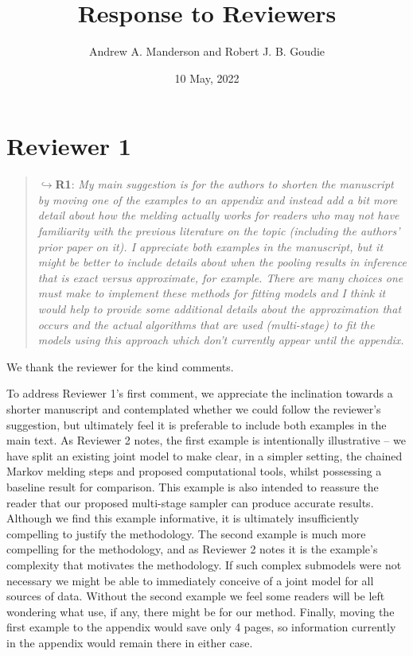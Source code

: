 \documentclass[
  10pt,
  a4paper,
]{article}
\title{Response to Reviewers}
\author{Andrew A. Manderson and Robert J. B. Goudie}
\date{10 May, 2022}
\begin{document}
\maketitle

\hypertarget{reviewer-1}{%
\section*{Reviewer 1}\label{reviewer-1}}

\begin{quote}
\(\hookrightarrow\)\textbf{R1}: \emph{My main suggestion is for the
authors to shorten the manuscript by moving one of the examples to an
appendix and instead add a bit more detail about how the melding
actually works for readers who may not have familiarity with the
previous literature on the topic (including the authors' prior paper on
it). I appreciate both examples in the manuscript, but it might be
better to include details about when the pooling results in inference
that is exact versus approximate, for example. There are many choices
one must make to implement these methods for fitting models and I think
it would help to provide some additional details about the approximation
that occurs and the actual algorithms that are used (multi-stage) to fit
the models using this approach which don't currently appear until the
appendix.}
\end{quote}

We thank the reviewer for the kind comments.

To address Reviewer 1's first comment, we appreciate the inclination
towards a shorter manuscript and contemplated whether we could follow
the reviewer's suggestion, but ultimately feel it is preferable to
include both examples in the main text. As Reviewer 2 notes, the first
example is intentionally illustrative -- we have split an existing joint
model to make clear, in a simpler setting, the chained Markov melding
steps and proposed computational tools, whilst possessing a baseline
result for comparison. This example is also intended to reassure the
reader that our proposed multi-stage sampler can produce accurate
results. Although we find this example informative, it is ultimately
insufficiently compelling to justify the methodology. The second example
is much more compelling for the methodology, and as Reviewer 2 notes it
is the example's complexity that motivates the methodology. If such
complex submodels were not necessary we might be able to immediately
conceive of a joint model for all sources of data. Without the second
example we feel some readers will be left wondering what use, if any,
there might be for our method. Finally, moving the first example to the
appendix would save only 4 pages, so information currently in the
appendix would remain there in either case.
\end{document}
